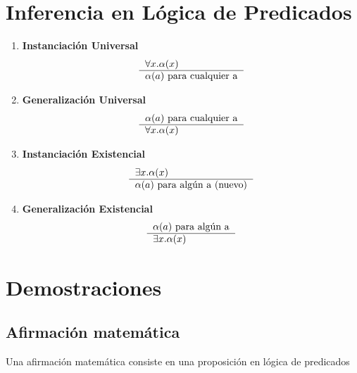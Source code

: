 \documentclass[../main.tex]{subfiles}
\begin{document}
\section{Inferencia en Lógica de Predicados}
\begin{enumerate}
    \item \textbf{Instanciación Universal}
    \[
        \begin{tabular}{l}
        $\forall{} x . \alpha{} (x)$ \\ \hline
        $\alpha{} (a)$ para cualquier a
        \end{tabular}
    \]
    \item \textbf{Generalización Universal}
    \[
        \begin{tabular}{l}
            $\alpha{} (a)$ para cualquier a \\ \hline
            $\forall{} x . \alpha{} (x)$
        \end{tabular}
    \]
    \item \textbf{Instanciación Existencial}
    \[
        \begin{tabular}{l}
        $\exists{} x . \alpha{} (x)$ \\ \hline
        $\alpha{} (a)$ para algún a (nuevo)
        \end{tabular}
    \]
    \item \textbf{Generalización Existencial}
    \[
        \begin{tabular}{l}
        $\alpha{} (a)$ para algún a\\ \hline
        $\exists{} x . \alpha{} (x)$
        \end{tabular}
    \]

\end{enumerate}


\section{Demostraciones}
\subsection{Afirmación matemática}
Una afirmación matemática consiste en una proposición en lógica de predicados
\end{document}
